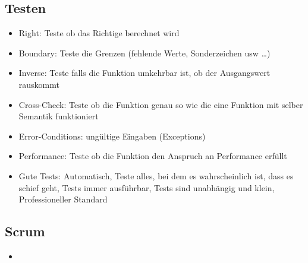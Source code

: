 \documentclass[11pt, fleqn, a4paper, leqno]{scrartcl} %
\begin{document}
		\subsection{Testen}
			\begin{itemize}
				\item Right: Teste ob das Richtige berechnet wird
				\item Boundary: Teste die Grenzen (fehlende Werte, Sonderzeichen usw \dots)
				\item Inverse: Teste falls die Funktion umkehrbar ist, ob der Ausgangswert rauskommt
				\item Cross-Check: Teste ob die Funktion genau so wie die eine Funktion mit selber Semantik funktioniert
				\item Error-Conditions: ungültige Eingaben (Exceptions)
				\item Performance: Teste ob die Funktion den Anspruch an Performance erfüllt
				\item Gute Tests: Automatisch, Teste alles, bei dem es wahrscheinlich ist, dass es schief geht, Tests immer ausführbar, Tests sind unabhängig und klein, Professioneller Standard
			\end{itemize}
		\subsection{Scrum}
			\begin{itemize}
				\item
			\end{itemize}
\end{document}
